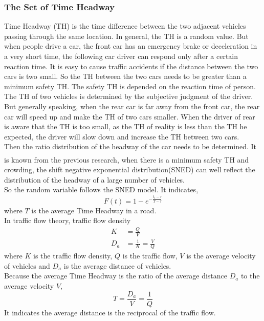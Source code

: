 \documentclass[UTF8]{mcmthesis}
\newcommand{\upcite}[1]{\textsuperscript{\textsuperscript{\cite{#1}}}}
\begin{document}
\subsubsection{The Set of Time Headway}
\indent Time Headway (TH) is the time difference between the two adjacent vehicles passing through the same location. In general, the TH is a random value. But when people drive a car, the front car has an emergency brake or deceleration in a very short time, the following car driver can respond only after a certain reaction time. It is easy to cause traffic accidents if the distance between the two cars is two small. So the TH between the two cars needs to be greater than a minimum safety TH. The safety TH is depended on the reaction time of person.\\
\indent The TH of two vehicles is determined by the subjective judgment of the driver. But generally speaking, when the rear car is far away from the front car, the rear car will speed up and make the TH of two cars smaller. When the driver of rear is aware that the TH is too small, as the TH of reality is less than the TH he expected, the driver will slow down and increase the TH between two cars.\\
\indent Then the ratio distribution of the headway of the car needs to be determined. It is known from the previous research\upcite{TH}, when there is a minimum safety TH and crowding, the shift negative exponential distribution(SNED) can well reflect the distribution of the headway of a large number of vehicles.\\
\indent So the random variable follows the SNED model. It indicates,
\begin{equation}
		F(t)=1-e^{-\frac{t_{i}-\tau }{T-\tau}}
\end{equation}
where $T$ is the average Time Headway in a road.\\ 

\indent In traffic flow theory, traffic flow density\\
\begin{equation}
\begin{split}
 K &= \frac{Q}{V}\\
 D_{a}&=\frac{1}{K}=\frac{V}{Q}
\end{split}
\end{equation}
where $K$ is the traffic flow density, $Q$ is the traffic flow, $V$ is the average velocity of vehicles and $D_{a}$ is the average distance of vehicles.\\
\indent Because the average Time Headway is the ratio of the average distance $D_{a}$ to the average velocity $V $,\\
\begin{equation}
	T=\frac{D_{a}}{V}=\frac{1}{Q}
\end{equation}
\indent It indicates the average distance is the reciprocal of the traffic flow.
\end{document}
